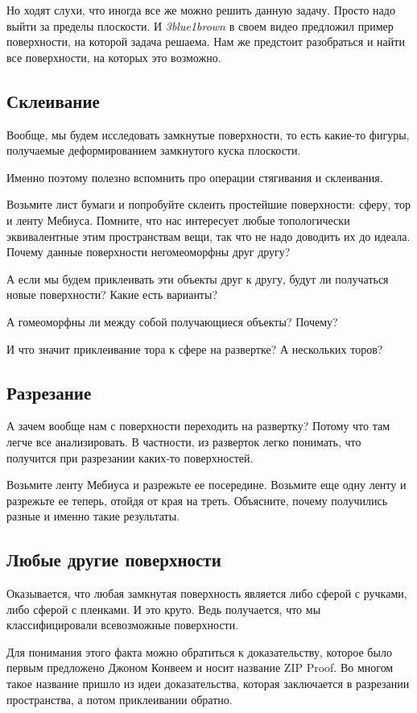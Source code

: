 \documentclass[a4paper,14pt]{extarticle}
\begin{document}
Но ходят слухи, что иногда все же можно решить данную задачу. Просто надо выйти за пределы плоскости. И \textit{3blue1brown} в своем видео предложил пример поверхности, на которой задача решаема. Нам же предстоит разобраться и найти все поверхности, на которых это возможно.

\subsection{Склеивание}
Вообще, мы будем исследовать замкнутые поверхности, то есть какие-то фигуры, получаемые деформированием замкнутого куска плоскости.

Именно поэтому полезно вспомнить про операции стягивания и склеивания. 

Возьмите лист бумаги и попробуйте склеить простейшие поверхности: сферу, тор и ленту Мебиуса. Помните, что нас интересует любые топологически эквивалентные этим пространствам вещи, так что не надо доводить их до идеала. Почему данные поверхности негомеоморфны друг другу? 

А если мы будем приклеивать эти объекты друг к другу, будут ли получаться новые поверхности? Какие есть варианты?

А гомеоморфны ли между собой получающиеся объекты? Почему?

И что значит приклеивание тора к сфере на развертке? А нескольких торов?

\subsection{Разрезание}
А зачем вообще нам с поверхности переходить на развертку? Потому что там легче все анализировать. В частности, из разверток легко понимать, что получится при разрезании каких-то поверхностей.

Возьмите ленту Мебиуса и разрежьте ее посередине. Возьмите еще одну ленту и разрежьте ее теперь, отойдя от края  на треть. Объясните, почему получились разные и именно такие результаты.

\subsection{Любые другие поверхности}
Оказывается, что любая замкнутая поверхность является либо сферой с ручками, либо сферой с пленками. И это круто. Ведь получается, что мы классифицировали всевозможные поверхности. 

Для понимания этого факта можно обратиться к доказательству, которое было первым предложено Джоном Конвеем и носит название ZIP Proof. Во многом такое название пришло из идеи доказательства, которая заключается в разрезании пространства, а потом приклеивании обратно.
\end{document}
